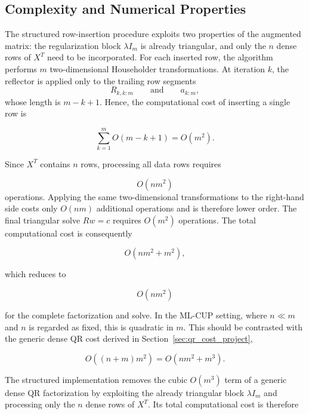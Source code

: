 \documentclass[11pt,a4paper]{article}
\begin{document}
\subsection{Complexity and Numerical Properties}

The structured row-insertion procedure exploits two properties of the augmented matrix: the regularization block $\lambda I_m$ is already triangular, and only the $n$ dense rows of $X^T$ need to be incorporated. For each inserted row, the algorithm performs $m$ two-dimensional Householder transformations.
At iteration $k$, the reflector is applied only to the trailing row segments \begin{equation} R_{k,k:m} \qquad\text{and}\qquad a_{k:m}, \end{equation} whose length is $m-k+1$. 
Hence, the computational cost of inserting a single row is

\begin{equation}
    \sum_{k=1}^{m} O(m-k+1) = O(m^2).
\end{equation}

Since $X^T$ contains $n$ rows, processing all data rows requires

\begin{equation}
    \label{eq:structured_qr_cost} O(nm^2)
\end{equation}
operations.
Applying the same two-dimensional transformations to the right-hand side costs only $O(nm)$ additional operations and is therefore lower order.
The final triangular solve $Rw=c$ requires $O(m^2)$ operations.
The total computational cost is consequently

\begin{equation}
    O(nm^2+m^2),
\end{equation}

which reduces to

\begin{equation}
    O(nm^2)
\end{equation}

for the complete factorization and solve.
In the ML-CUP setting, where $n\ll m$ and $n$ is regarded as fixed, this is quadratic in $m$.
This should be contrasted with the generic dense QR cost derived in Section~\ref{sec:qr_cost_project},

\begin{equation}
    O((n+m)m^2) = O(nm^2+m^3).
\end{equation}

The structured implementation removes the cubic $O(m^3)$ term of a generic dense QR factorization by exploiting the already triangular block $\lambda I_m$ and processing only the $n$ dense rows of $X^T$.
Its total computational cost is therefore
\end{document}
